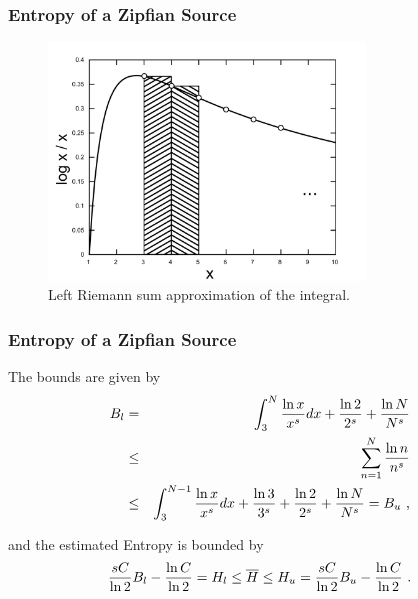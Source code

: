 \documentclass[notes]{beamer}
\begin{document}
\frame
{
  \frametitle{Entropy of a Zipfian Source}
  \begin{figure}[h]
  \centering
  \includegraphics[width=0.75\textwidth]{images/logk_k_integral.pdf}
  \caption{Left Riemann sum approximation of the integral.}
  \label{fig:logk_k_integral}
  \end{figure}
}


\frame
{
  \frametitle{Entropy of a Zipfian Source}
  The bounds are given by
  \begin{eqnarray}
  \label{eq:riemmansumeboundsfinal}
  B_l &=& \int_{3}^{N} \frac{\ln x}{x^s} dx + \frac{\ln 2}{2^s} + \frac{\ln N}{N^s} \nonumber \\ 
      &\leq& \sum_{n=1}^{N} \frac{\ln n}{n^s} \nonumber \\
      &\leq& \int_{3}^{N-1} \frac{\ln x}{x^s} dx + \frac{\ln 3}{3^s} + \frac{\ln 2}{2^s} + \frac{\ln N}{N^s} = B_u \textmd{ ,}
  \end{eqnarray}

  and the estimated Entropy is bounded by
  \begin{equation}
  \frac{sC}{\ln 2} B_l - \frac{\ln C}{\ln 2} =  H_l \leq  \overline{H} \leq H_u = \frac{sC}{\ln 2} B_u - \frac{\ln C}{\ln 2} \textmd{ .}
  \end{equation}
}
\end{document}
